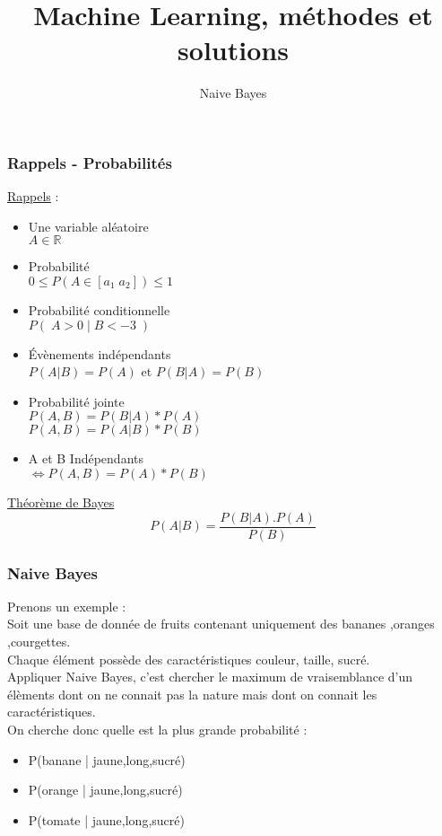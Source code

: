 \documentclass{formation}
\title{Machine Learning, méthodes et solutions}
\subtitle{Naive Bayes}
\begin{document}
\maketitle

\begin{frame}
  \frametitle{Rappels - Probabilités}
  \begin{minipage}[c]{0.60\linewidth}
    \underline{Rappels} :
    \begin{itemize}
    \item Une variable aléatoire \\ $A\in\mathbb{R}$
    \item Probabilité \\ $0 \leq P(A\in[a_1\;a_2]) \leq 1$
    \item Probabilité conditionnelle \\ $P(\;A>0\;|\;B<-3\;)$
    \item Évènements indépendants \\ $P(A|B)=P(A)$ et $P(B|A)=P(B)$
    \item Probabilité jointe \\ $P(A,B)=P(B|A)*P(A)$ \\ $P(A,B)=P(A|B)*P(B)$
    \item A et B Indépendants \\ $\iff P(A,B) = P(A)*P(B)$ 
    \end{itemize}
  \end{minipage}\hfill
  \begin{minipage}[c]{0.39\linewidth}
    \begin{center}
      \underline{Théorème de Bayes}
      \[
      \boxed{P(A|B)=\frac{P(B|A).P(A)}{P(B)}}
      \]
    \end{center}
  \end{minipage}\hfill
\end{frame}

\begin{frame}
  \frametitle{Naive Bayes}
  Prenons un exemple : \\
  Soit une base de donnée de fruits contenant uniquement des bananes ,oranges ,courgettes. \\
  Chaque élément possède des caractéristiques couleur, taille, sucré. \\
  Appliquer Naive Bayes, c'est chercher le maximum de vraisemblance d'un élèments dont on ne connait pas la nature mais dont on connait les caractéristiques. \\
  On cherche donc quelle est la plus grande probabilité :
  \begin{itemize}
  \item P(banane | jaune,long,sucré)
  \item P(orange | jaune,long,sucré)
  \item P(tomate | jaune,long,sucré)
  \end{itemize}
\end{frame}
\end{document}
